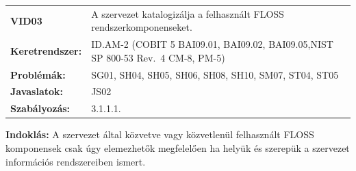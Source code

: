 \documentclass[12pt,magyar,a4paper,oneside]{scrreprt}
\begin{document}
\begin{longtable}[]{@{}ll@{}}
\toprule
\endhead
\begin{minipage}[t]{0.16\columnwidth}\raggedright
\textbf{VID03}\strut
\end{minipage} & \begin{minipage}[t]{0.79\columnwidth}\raggedright
A szervezet katalogizálja a felhasznált FLOSS
rendszerkomponenseket.\strut
\end{minipage}\tabularnewline
\begin{minipage}[t]{0.16\columnwidth}\raggedright
\textbf{Keretrendszer:}\strut
\end{minipage} & \begin{minipage}[t]{0.79\columnwidth}\raggedright
ID.AM-2 (COBIT 5 BAI09.01, BAI09.02, BAI09.05,NIST SP 800-53 Rev.~4
CM-8, PM-5)\strut
\end{minipage}\tabularnewline
\begin{minipage}[t]{0.16\columnwidth}\raggedright
\textbf{Problémák:}\strut
\end{minipage} & \begin{minipage}[t]{0.79\columnwidth}\raggedright
SG01, SH04, SH05, SH06, SH08, SH10, SM07, ST04, ST05\strut
\end{minipage}\tabularnewline
\begin{minipage}[t]{0.16\columnwidth}\raggedright
\textbf{Javaslatok:}\strut
\end{minipage} & \begin{minipage}[t]{0.79\columnwidth}\raggedright
JS02\strut
\end{minipage}\tabularnewline
\begin{minipage}[t]{0.16\columnwidth}\raggedright
\textbf{Szabályozás:}\strut
\end{minipage} & \begin{minipage}[t]{0.79\columnwidth}\raggedright
3.1.1.1.\strut
\end{minipage}\tabularnewline
\bottomrule
\end{longtable}

\textbf{Indoklás: } A szervezet által közvetve vagy közvetlenül
felhasznált FLOSS komponensek csak úgy elemezhetők megfelelően ha helyük
és szerepük a szervezet információs rendszereiben ismert.
\end{document}
